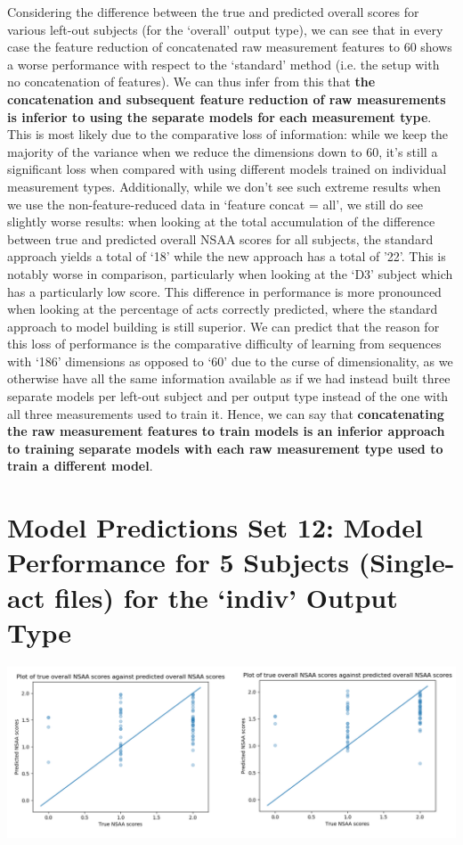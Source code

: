 \documentclass[12pt,twoside]{report}
\begin{document}
\quad Considering the difference between the true and predicted overall scores for various left-out subjects (for the ‘overall’ output type), we can see that in every case the feature reduction of concatenated raw measurement features to 60 shows a worse performance with respect to the ‘standard’ method (i.e. the setup with no concatenation of features). We can thus infer from this that \textbf{the concatenation and subsequent feature reduction of raw measurements is inferior to using the separate models for each measurement type}. This is most likely due to the comparative loss of information: while we keep the majority of the variance when we reduce the dimensions down to 60, it’s still a significant loss when compared with using different models trained on individual measurement types. Additionally, while we don’t see such extreme results when we use the non-feature-reduced data in ‘feature concat = all’, we still do see slightly worse results: when looking at the total accumulation of the difference between true and predicted overall NSAA scores for all subjects, the standard approach yields a total of ‘18’ while the new approach has a total of ’22’. This is notably worse in comparison, particularly when looking at the ‘D3’ subject which has a particularly low score. This difference in performance is more pronounced when looking at the percentage of acts correctly predicted, where the standard approach to model building is still superior. We can predict that the reason for this loss of performance is the comparative difficulty of learning from sequences with ‘186’ dimensions as opposed to ‘60’ due to the curse of dimensionality, as we otherwise have all the same information available as if we had instead built three separate models per left-out subject and per output type instead of the one with all three measurements used to train it. Hence, we can say that \textbf{concatenating the raw measurement features to train models is an inferior approach to training separate models with each raw measurement type used to train a different model}.




\section{Model Predictions Set 12: Model Performance for 5 Subjects (Single-act files) for the ‘indiv’ Output Type}

\begin{center}
\includegraphics[scale=0.4]{project_figures/fig11_19}
\end{center}
\end{document}
